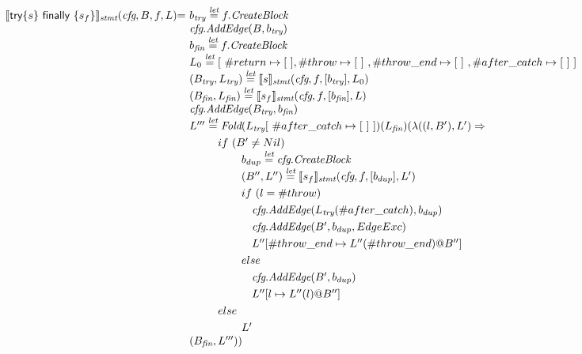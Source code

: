\[
\begin{array}{l@{}l@{~}l}
\transfun{\ircfgtryfin{s}{s_f}}_{\emph{stmt}}(\emph{cfg}, B, f, L) & = &
b_{\emph{try}} \letval f.\emph{CreateBlock}\\
& & \emph{cfg}.\emph{AddEdge}(B, b_{\emph{try}})\\
& & b_{\emph{fin}} \letval f.\emph{CreateBlock}\\
& & L_0 \letval [\ \#return \mapsto [\ ], \#throw \mapsto [\ ]\ , \#throw\_end \mapsto [\ ]\ , \#after\_catch \mapsto [\ ]\ ] \\
& & (B_{\emph{try}},L_{\emph{try}}) \letval \transfun{s}_{\emph{stmt}}(\emph{cfg}, f, [b_{\emph{try}}], L_0)\\
& & (B_{\emph{fin}},L_{\emph{fin}}) \letval \transfun{s_f}_{\emph{stmt}}(\emph{cfg}, f, [b_{\emph{fin}}], L)\\
& & \emph{cfg}.\emph{AddEdge}(B_{\emph{try}}, b_{\emph{fin}})\\
& & L''' \letval \Fold(L_{\emph{try}}[\ \#after\_catch \mapsto [\ ]\ ])(L_{\emph{fin}})(\lambda((l, B'),L') \Rightarrow\\
& & \phantom{L''' \letval}if\ (B' \neq Nil)\\
& & \phantom{L''' \letval \Fold} b_{dup} \letval \emph{cfg}.\emph{CreateBlock}\\
& & \phantom{L''' \letval \Fold} (B'',L'') \letval \transfun{s_f}_{\emph{stmt}}(\emph{cfg}, f, [b_{dup}], L')\\
& & \phantom{L''' \letval \Fold}if\ (l = \#throw)\\	
& & \phantom{L''' \letval \Fold if} \emph{cfg}.\emph{AddEdge}(L_{\emph{try}}(\#after\_catch), b_{dup})\\
& & \phantom{L''' \letval \Fold if} \emph{cfg}.\emph{AddEdge}(B', b_{dup}, EdgeExc)\\
& & \phantom{L''' \letval \Fold if} L''[\#throw\_end \mapsto L''(\#throw\_end)@B'']\\
& & \phantom{L''' \letval \Fold}else\\
& & \phantom{L''' \letval \Fold if} \emph{cfg}.\emph{AddEdge}(B', b_{dup})\\
& & \phantom{L''' \letval \Fold if} L''[l \mapsto L''(l)@B'']\\
& & \phantom{L''' \letval}else\\
& & \phantom{L''' \letval \Fold}L'\\
& & (B_{\emph{fin}}, L'''))\\
& & \\


\end{array}\]

